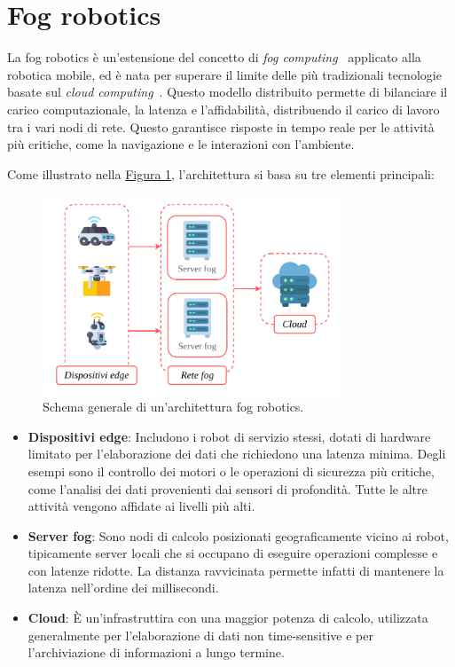 \documentclass[12pt]{report}
\begin{document}
\section{Fog robotics}
\label{sec:fog_robotics}

La fog robotics è un'estensione del concetto di \textit{fog computing}~\cite{10.1145/2757384.2757397} applicato alla robotica mobile, ed è nata per superare il limite delle più tradizionali tecnologie basate sul \textit{cloud computing}~\cite{qian2009cloud}. Questo modello distribuito permette di bilanciare il carico computazionale, la latenza e l'affidabilità, distribuendo il carico di lavoro tra i vari nodi di rete. Questo garantisce risposte in tempo reale per le attività più critiche, come la navigazione e le interazioni con l'ambiente.

Come illustrato nella \hyperref[fig:fog_robotics]{Figura \ref{fig:fog_robotics}}, l'architettura si basa su tre elementi principali:

\begin{figure}[t]
	\centering
	\includegraphics[width=0.8\textwidth, clip]{images/fog-robotics}
	\caption{Schema generale di un'architettura fog robotics.}
	\label{fig:fog_robotics}
\end{figure}

\begin{itemize}
	\item \textbf{Dispositivi edge}: Includono i robot di servizio stessi, dotati di hardware limitato per l'elaborazione dei dati che richiedono una latenza minima. Degli esempi sono il controllo dei motori o le operazioni di sicurezza più critiche, come l'analisi dei dati provenienti dai sensori di profondità. Tutte le altre attività vengono affidate ai livelli più alti.
	
	\item \textbf{Server fog}: Sono nodi di calcolo posizionati geograficamente vicino ai robot, tipicamente server locali che si occupano di eseguire operazioni complesse e con latenze ridotte. La distanza ravvicinata permette infatti di mantenere la latenza nell'ordine dei millisecondi.
	
	\item \textbf{Cloud}: È un'infrastruttira con una maggior potenza di calcolo, utilizzata generalmente per l'elaborazione di dati non time-sensitive e per l'archiviazione di informazioni a lungo termine.
\end{itemize}
\end{document}
